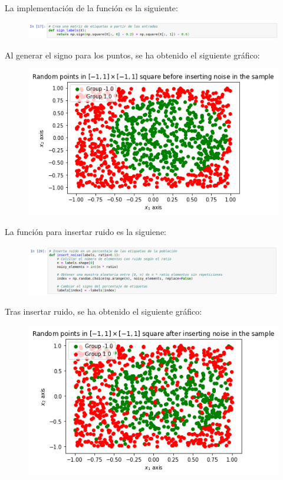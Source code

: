 \documentclass[11pt,a4paper]{article}
\begin{document}
\begin{itemize}
	La implementación de la función es la siguiente:
	
	\begin{figure}[H]
	\centering
	\includegraphics[scale=0.4]{img/sign_func.png}
	\end{figure}
	
	Al generar el signo para los puntos, se ha obtenido el siguiente gráfico:
	
	\begin{figure}[H]
	\centering
	\includegraphics[scale=0.6]{img/sign_points.png}
	\end{figure}
	
	La función para insertar ruido es la siguiene:
	
	\begin{figure}[H]
	\centering
	\includegraphics[scale=0.4]{img/noise_func.png}
	\end{figure}
	
	Tras insertar ruido, se ha obtenido el siguiente gráfico:
	
	\begin{figure}[H]
	\centering
	\includegraphics[scale=0.6]{img/random_noise.png}
	\end{figure}
	

\end{itemize}
\end{document}
